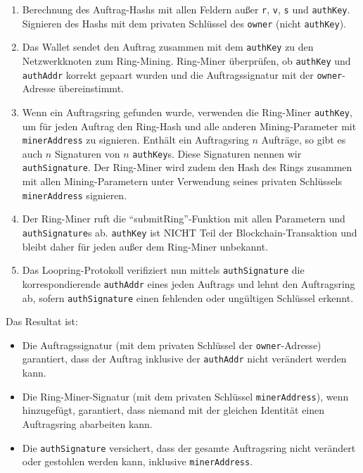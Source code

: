 \documentclass[UTF8,nofonts]{article}
\begin{document}
\begin{multicols}{2}
\begin{enumerate}
	\item Berechnung des Auftrag-Hashs mit allen Feldern außer \verb|r|, \verb|v|, \verb|s| und \verb|authKey|. Signieren des Hashs mit dem privaten Schlüssel des \verb|owner| (nicht \verb|authKey|).

	\item Das Wallet sendet den Auftrag zusammen mit dem \verb|authKey| zu den Netzwerkknoten zum Ring-Mining. Ring-Miner überprüfen, ob \verb|authKey| und \verb|authAddr| korrekt gepaart wurden und die Auftragssignatur mit der \verb|owner|-Adresse übereinstimmt.

	\item Wenn ein Auftragsring gefunden wurde, verwenden die Ring-Miner \verb|authKey|, um für jeden Auftrag den Ring-Hash und alle anderen Mining-Parameter mit \verb|minerAddress| zu signieren. Enthält ein Auftragsring $n$ Aufträge, so gibt es auch $n$ Signaturen von $n$ \verb|authKey|s. Diese Signaturen nennen wir \verb|authSignature|. Der Ring-Miner wird zudem den Hash des Rings zusammen mit allen Mining-Parametern unter Verwendung seines privaten Schlüssels \verb|minerAddress| signieren.

	\item Der Ring-Miner ruft die \enquote{submitRing}-Funktion mit allen Parametern und \verb|authSignature|s ab. \verb|authKey| ist NICHT Teil der Blockchain-Transaktion und bleibt daher für jeden außer dem Ring-Miner unbekannt.

	\item Das Loopring-Protokoll verifiziert nun mittels \verb|authSignature| die korrespondierende \verb|authAddr| eines jeden Auftrags und lehnt den Auftragsring ab, sofern \verb|authSignature| einen fehlenden oder ungültigen Schlüssel erkennt.
 
\end{enumerate}

Das Resultat ist:

\begin{itemize}

	\item  Die Auftragssignatur (mit dem privaten Schlüssel der \verb|owner|-Adresse) garantiert, dass der Auftrag inklusive der \verb|authAddr| nicht verändert werden kann.
	\item  Die Ring-Miner-Signatur (mit dem privaten Schlüssel \verb|minerAddress|), wenn hinzugefügt, garantiert, dass niemand mit der gleichen Identität einen Auftragsring abarbeiten kann.
	\item  Die \verb|authSignature| versichert, dass der gesamte Auftragsring nicht verändert oder gestohlen werden kann, inklusive \verb|minerAddress|.


\end{itemize}
\end{multicols}
\end{document}
